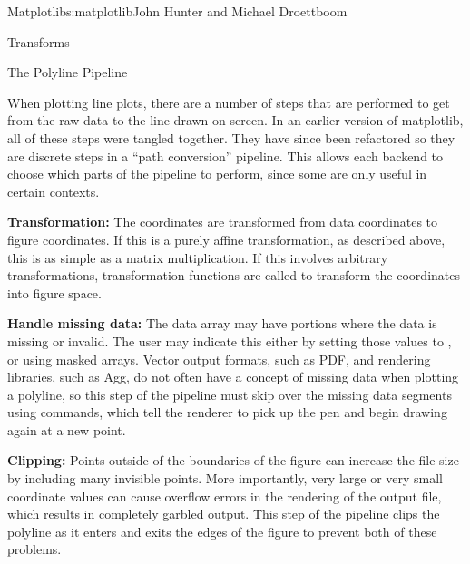 \begin{aosachapter}{Matplotlib}{s:matplotlib}{John Hunter and Michael Droettboom}
\begin{aosasect1}{Transforms}

\end{aosasect1}

\begin{aosasect1}{The Polyline Pipeline}

When plotting line plots, there are a number of steps that are
performed to get from the raw data to the line drawn on screen.  In an
earlier version of matplotlib, all of these steps were tangled
together.  They have since been refactored so they are discrete steps
in a ``path conversion'' pipeline.  This allows each backend to choose
which parts of the pipeline to perform, since some are only useful in
certain contexts.

\begin{aosaenumerate}

\item \textbf{Transformation:} The coordinates are transformed from data
  coordinates to figure coordinates.  If this is a purely affine
  transformation, as described above, this is as simple as a matrix
  multiplication.  If this involves arbitrary transformations,
  transformation functions are called to transform the coordinates
  into figure space.

\item \textbf{Handle missing data:} The data array may have portions
  where the data is missing or invalid.  The user may indicate this
  either by setting those values to , or using  masked arrays.
  Vector output formats, such as PDF, and rendering libraries, such as
  Agg, do not often have a concept of missing data when plotting a
  polyline, so this step of the pipeline must skip over the missing
  data segments using  commands, which tell the renderer
  to pick up the pen and begin drawing again at a new point.

\item \textbf{Clipping:} Points outside of the boundaries of the
  figure can increase the file size by including many invisible
  points.  More importantly, very large or very small coordinate
  values can cause overflow errors in the rendering of the output
  file, which results in completely garbled output.  This step of the
  pipeline clips the polyline as it enters and exits the edges of the
  figure to prevent both of these problems.


\end{aosaenumerate}
\end{aosasect1}
\end{aosachapter}
